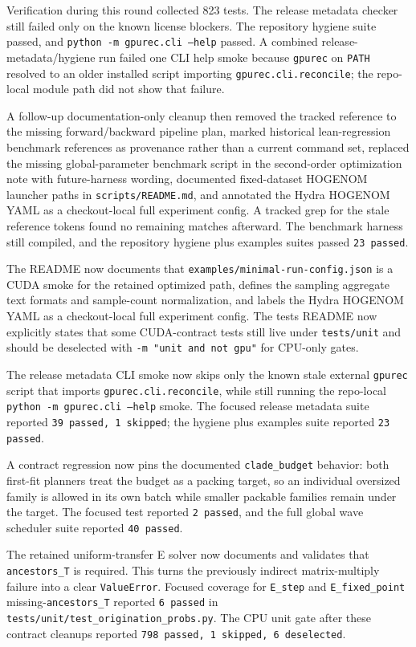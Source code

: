 \documentclass[11pt]{article}
\begin{document}
Verification during this round collected 823 tests.  The release metadata
checker still failed only on the known license blockers.  The repository
hygiene suite passed, and \texttt{python -m gpurec.cli --help} passed.  A
combined release-metadata/hygiene run failed one CLI help smoke because
\texttt{gpurec} on \texttt{PATH} resolved to an older installed script importing
\texttt{gpurec.cli.reconcile}; the repo-local module path did not show that
failure.

A follow-up documentation-only cleanup then removed the tracked reference to
the missing forward/backward pipeline plan, marked historical lean-regression
benchmark references as provenance rather than a current command set, replaced
the missing global-parameter benchmark script in the second-order optimization
note with future-harness wording, documented fixed-dataset HOGENOM launcher
paths in \texttt{scripts/README.md}, and annotated the Hydra HOGENOM YAML as a
checkout-local full experiment config.  A tracked grep for the stale reference
tokens found no remaining matches afterward.  The benchmark harness still
compiled, and the repository hygiene plus examples suites passed
\texttt{23 passed}.

The README now documents that \texttt{examples/minimal-run-config.json} is a
CUDA smoke for the retained optimized path, defines the sampling aggregate text
formats and sample-count normalization, and labels the Hydra HOGENOM YAML as a
checkout-local full experiment config.  The tests README now explicitly states
that some CUDA-contract tests still live under \texttt{tests/unit} and should be
deselected with \texttt{-m "unit and not gpu"} for CPU-only gates.

The release metadata CLI smoke now skips only the known stale external
\texttt{gpurec} script that imports \texttt{gpurec.cli.reconcile}, while still
running the repo-local \texttt{python -m gpurec.cli --help} smoke.  The focused
release metadata suite reported \texttt{39 passed, 1 skipped}; the hygiene plus
examples suite reported \texttt{23 passed}.

A contract regression now pins the documented \texttt{clade\_budget} behavior:
both first-fit planners treat the budget as a packing target, so an individual
oversized family is allowed in its own batch while smaller packable families
remain under the target.  The focused test reported \texttt{2 passed}, and the
full global wave scheduler suite reported \texttt{40 passed}.

The retained uniform-transfer E solver now documents and validates that
\texttt{ancestors\_T} is required.  This turns the previously indirect
matrix-multiply failure into a clear \texttt{ValueError}.  Focused coverage for
\texttt{E\_step} and \texttt{E\_fixed\_point} missing-\texttt{ancestors\_T}
reported \texttt{6 passed} in \texttt{tests/unit/test\_origination\_probs.py}.
The CPU unit gate after these contract cleanups reported
\texttt{798 passed, 1 skipped, 6 deselected}.
\end{document}
